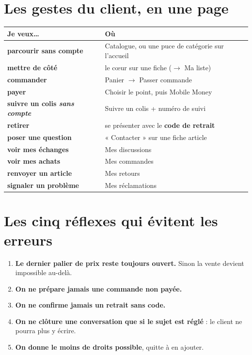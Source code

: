 \documentclass[11pt,a4paper]{report}
\begin{document}
\section{Les gestes du client, en une page}

\begin{longtable}{@{}>{\bfseries}p{5.6cm} p{9.2cm}@{}}
\toprule
Je veux\dots & Où \\
\midrule
\endhead
parcourir sans compte & Catalogue, ou une puce de catégorie sur l'accueil \\
mettre de côté & le cœur sur une fiche ($\rightarrow$ Ma liste) \\
commander & Panier $\rightarrow$ Passer commande \\
payer & Choisir le point, puis Mobile Money \\
suivre un colis \emph{sans compte} & Suivre un colis + numéro de suivi \\
retirer & se présenter avec le \textbf{code de retrait} \\
poser une question & « Contacter » sur une fiche article \\
voir mes échanges & Mes discussions \\
voir mes achats & Mes commandes \\
renvoyer un article & Mes retours \\
signaler un problème & Mes réclamations \\
\bottomrule
\end{longtable}

\section{Les cinq réflexes qui évitent les erreurs}

\begin{enumerate}[leftmargin=*,itemsep=5pt]
  \item \textbf{Le dernier palier de prix reste toujours ouvert.} Sinon la
        vente devient impossible au-delà.
  \item \textbf{On ne prépare jamais une commande non payée.}
  \item \textbf{On ne confirme jamais un retrait sans code.}
  \item \textbf{On ne clôture une conversation que si le sujet est réglé} : le
        client ne pourra plus y écrire.
  \item \textbf{On donne le moins de droits possible}, quitte à en ajouter.
\end{enumerate}
\end{document}
